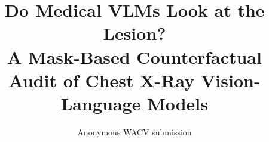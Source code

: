 \documentclass[10pt,twocolumn,letterpaper]{article}
\title{Do Medical VLMs Look at the Lesion? \\
A Mask-Based Counterfactual Audit of Chest X-Ray Vision-Language Models}
\author{Anonymous WACV submission}
\begin{document}
\maketitle










{
\small


}

% 
\end{document}
